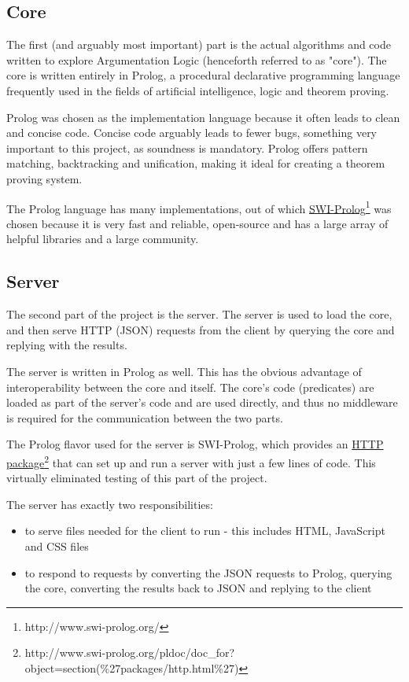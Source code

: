 \documentclass[11pt,twoside,a4paper]{report}
\begin{document}
\subsection{Core}
The first (and arguably most important) part is the actual algorithms and code written to explore Argumentation Logic (henceforth referred to as "core"). The core is written entirely in Prolog, a procedural declarative programming language frequently used in the fields of artificial intelligence, logic and theorem proving. 

Prolog was chosen as the implementation language because it often leads to clean and concise code. Concise code arguably leads to fewer bugs, something very important to this project, as soundness is mandatory. Prolog offers pattern matching, backtracking and unification, making it ideal for creating a theorem proving system.

The Prolog language has many implementations, out of which \href{http://www.swi-prolog.org/}{SWI-Prolog}\footnote{http://www.swi-prolog.org/} was chosen because it is very fast and reliable, open-source and has a large array of helpful libraries and a large community.

\subsection{Server}
The second part of the project is the server. The server is used to load the core, and then serve HTTP (JSON) requests from the client by querying the core and replying with the results.

The server is written in Prolog as well. This has the obvious advantage of interoperability between the core and itself. The core's code (predicates) are loaded as part of the server's code and are used directly, and thus no middleware is required for the communication between the two parts.

The Prolog flavor used for the server is SWI-Prolog, which provides an \href{http://www.swi-prolog.org/pldoc/doc_for?object=section(\%27packages/http.html\%27)}{HTTP package}\footnote{http://www.swi-prolog.org/pldoc/doc\_for?object=section(\%27packages/http.html\%27)} that can set up and run a server with just a few lines of code. This virtually eliminated testing of this part of the project.

The server has exactly two responsibilities:

\begin{itemize}
\item
to serve files needed for the client to run - this includes HTML, JavaScript and CSS files
\item
to respond to requests by converting the JSON requests to Prolog, querying the core, converting the results back to JSON and replying to the client
\end{itemize}
\end{document}
